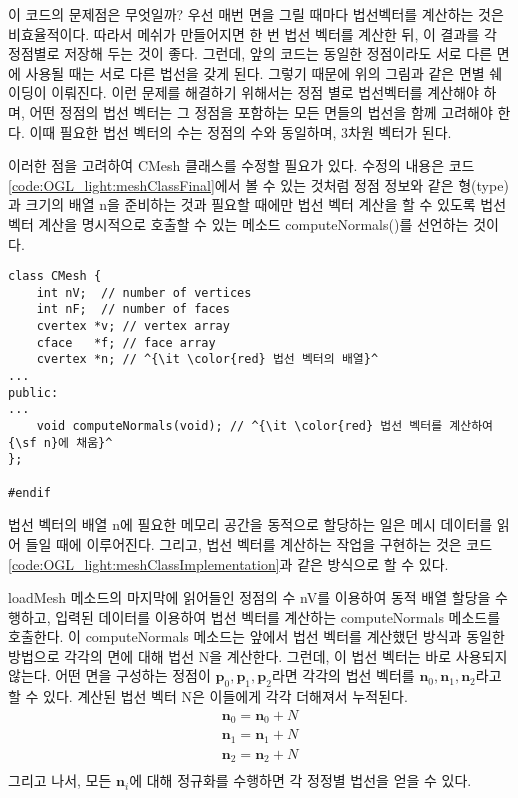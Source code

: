 이 코드의 문제점은 무엇일까? 우선 매번 면을 그릴 때마다 법선벡터를 계산하는 것은 비효율적이다. 따라서 메쉬가 만들어지면 한 번 법선 벡터를 계산한 뒤, 이 결과를 각 정점별로 저장해 두는 것이 좋다. 그런데, 앞의 코드는 동일한 정점이라도 서로 다른 면에 사용될 때는 서로 다른 법선을 갖게 된다. 그렇기 때문에 위의 그림과 같은 면별 쉐이딩이 이뤄진다. 
이런 문제를 해결하기 위해서는 정점 별로 법선벡터를 계산해야 하며, 어떤 정점의 법선 벡터는 그 정점을 포함하는 모든 면들의 법선을 
함께 고려해야 한다. 이때 필요한 법선 벡터의 수는 정점의 수와 동일하며, 3차원 벡터가 된다.

이러한 점을 고려하여 {\sf CMesh} 클래스를 수정할 필요가 있다. 
수정의 내용은 코드 \ref{code:OGL_light:meshClassFinal}에서 볼 수 있는 것처럼 정점 정보와 같은 형(type)과 크기의 배열 {\sf n}을 준비하는 것과
필요할 때에만 법선 벡터 계산을 할 수 있도록 법선 벡터 계산을 명시적으로 호출할 수 있는 메소드
{\sf computeNormals()}를 선언하는 것이다.

\begin{algorithmbis}\label{code:OGL_light:meshClassFinal}
\lstset{language=C++, escapechar=^} 
\begin{lstlisting}
class CMesh {
    int nV;  // number of vertices
    int nF;  // number of faces
    cvertex *v; // vertex array
    cface   *f; // face array
    cvertex *n; // ^{\it \color{red} 법선 벡터의 배열}^
...
public:
...
    void computeNormals(void); // ^{\it \color{red} 법선 벡터를 계산하여 {\sf n}에 채움}^
};

#endif
\end{lstlisting}
\end{algorithmbis}

법선 벡터의 배열 {\sf n}에 필요한 메모리 공간을 동적으로 할당하는 일은
메시 데이터를 읽어 들일 때에 이루어진다.
그리고, 법선 벡터를 계산하는 작업을 구현하는 것은 코드 \ref{code:OGL_light:meshClassImplementation}과 같은
방식으로 할 수 있다.

{\sf loadMesh} 메소드의 마지막에 읽어들인 정점의 수 {\sf nV}를 이용하여 동적 배열 할당을 수행하고,
입력된 데이터를 이용하여 법선 벡터를 계산하는 {\sf computeNormals} 메소드를 호출한다.
이 {\sf computeNormals} 메소드는 앞에서 법선 벡터를 계산했던 방식과 동일한 방법으로
각각의 면에 대해 법선 {\sf N}을 계산한다. 그런데, 이 법선 벡터는 바로 사용되지 않는다.
어떤 면을 구성하는 정점이 $\mathbf p_0, \mathbf p_1, \mathbf p_2$라면
각각의 법선 벡터를 $\mathbf n_0, \mathbf n_1, \mathbf n_2$라고 할 수 있다.
계산된 법선 벡터 {\sf N}은 이들에게 각각 더해져서 누적된다.
\begin{eqnarray}
\mathbf n_0 = \mathbf n_0 + N \\ \nonumber
\mathbf n_1 = \mathbf n_1 + N \\ \nonumber
\mathbf n_2 = \mathbf n_2 + N \\ \nonumber
\end{eqnarray}
그리고 나서, 모든 $\mathbf n_i$에 대해 정규화를 수행하면 각 정정별 법선을 얻을 수 있다.

